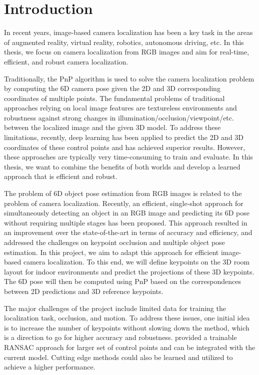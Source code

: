 \chapter{Introduction}

In recent years, image-based camera localization has been a key task in the areas of augmented reality, virtual reality, robotics, autonomous driving, etc. In this thesis, we focus on camera localization from RGB images and aim for real-time, efficient, and robust camera localization.

Traditionally, the PnP algorithm \cite{lepetit2009epnp} is used to solve the camera localization problem by computing the 6D camera pose given the 2D and 3D corresponding coordinates of multiple points. The fundamental problems of traditional approaches relying on local image features are textureless environments and robustness against strong changes in illumination/occlusion/viewpoint/etc. between the localized image and the given 3D model. To address these limitations, recently, deep learning has been applied to predict the 2D and 3D coordinates of these control points \cite{brachmann2017dsac} and has achieved superior results. However, these approaches are typically very time-consuming to train and evaluate. In this thesis, we want to combine the benefits of both worlds and develop a learned approach that is efficient and robust.

The problem of 6D object pose estimation from RGB images is related to the problem of camera localization. Recently, an efficient, single-shot approach for simultaneously detecting an object in an RGB image and predicting its 6D pose without requiring multiple stages \cite{tekin2018real} has been proposed. This approach resulted in an improvement over the state-of-the-art in terms of accuracy and efficiency, and addressed the challenges on keypoint occlusion and multiple object pose estimation. In this project, we aim to adapt this approach for efficient image-based camera localization. To this end, we will define keypoints on the 3D room layout for indoor environments and predict the projections of these 3D keypoints. The 6D pose will then be computed using PnP \cite{lepetit2009epnp} based on the correspondences between 2D predictions and 3D reference keypoints.

The major challenges of the project include limited data for training the localization task, occlusion, and motion. To address these issues, one initial idea is to increase the number of keypoints without slowing down the method, which is a direction to go for higher accuracy and robustness. \cite{brachmann2017dsac} provided a trainable RANSAC approach for larger set of control points and can be integrated with the current model. Cutting edge methods could also be learned and utilized to achieve a higher performance.


